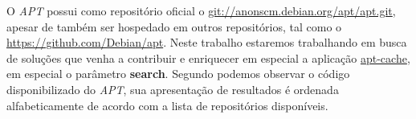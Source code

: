 O \textit{APT} possui como repositório oficial o \url{git://anonscm.debian.org/apt/apt.git}, apesar de também ser hospedado em outros repositórios, tal como o \url{https://github.com/Debian/apt}. Neste trabalho estaremos trabalhando em busca de soluções que venha a contribuir e enriquecer em especial a aplicação \href{https://github.com/Debian/apt/blob/debian/experimental/cmdline/apt-cache.cc}{apt-cache}, em especial o parâmetro \textbf{search}. Segundo podemos observar o código disponibilizado do \textit{APT}, sua apresentação de resultados é ordenada alfabeticamente de acordo com a lista de repositórios disponíveis.




